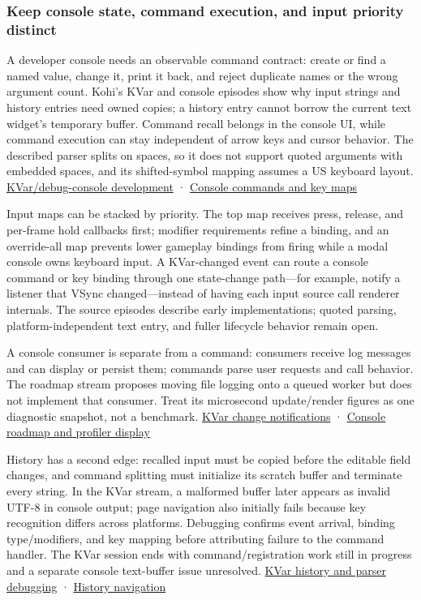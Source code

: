 \subsubsection{Keep console state, command execution, and input priority distinct}\label{06-engine-ii-ch032-keep-console-state-command-execution-and-input-priority-distinct}

\hypertarget{06-engine-ii-ch032-keep-console-state-command-execution-and-input-priority-distinct}{}

A developer console needs an observable command contract: create or find a named value, change it, print it back, and reject duplicate names or the wrong argument count. Kohi's KVar and console episodes show why input strings and history entries need owned copies; a history entry cannot borrow the current text widget's temporary buffer. Command recall belongs in the console UI, while command execution can stay independent of arrow keys and cursor behavior. The described parser splits on spaces, so it does not support quoted arguments with embedded spaces, and its shifted-symbol mapping assumes a US keyboard layout. \href{https://www.youtube.com/watch?v=vPaRWwSjki4}{KVar/debug-console development} · \href{https://www.youtube.com/watch?v=MM73i0sVXsc}{Console commands and key maps}

Input maps can be stacked by priority. The top map receives press, release, and per-frame hold callbacks first; modifier requirements refine a binding, and an override-all map prevents lower gameplay bindings from firing while a modal console owns keyboard input. A KVar-changed event can route a console command or key binding through one state-change path---for example, notify a listener that VSync changed---instead of having each input source call renderer internals. The source episodes describe early implementations; quoted parsing, platform-independent text entry, and fuller lifecycle behavior remain open.

A console consumer is separate from a command: consumers receive log messages and can display or persist them; commands parse user requests and call behavior. The roadmap stream proposes moving file logging onto a queued worker but does not implement that consumer. Treat its microsecond update/render figures as one diagnostic snapshot, not a benchmark. \href{https://www.youtube.com/watch?v=6cn8Ip0IJsw}{KVar change notifications} · \href{https://www.youtube.com/watch?v=MM73i0sVXsc}{Console roadmap and profiler display}

History has a second edge: recalled input must be copied before the editable field changes, and command splitting must initialize its scratch buffer and terminate every string. In the KVar stream, a malformed buffer later appears as invalid UTF-8 in console output; page navigation also initially fails because key recognition differs across platforms. Debugging confirms event arrival, binding type/modifiers, and key mapping before attributing failure to the command handler. The KVar session ends with command/registration work still in progress and a separate console text-buffer issue unresolved. \href{https://www.youtube.com/watch?v=tXPhFa7GGMs}{KVar history and parser debugging} · \href{https://www.youtube.com/watch?v=vPaRWwSjki4}{History navigation}

